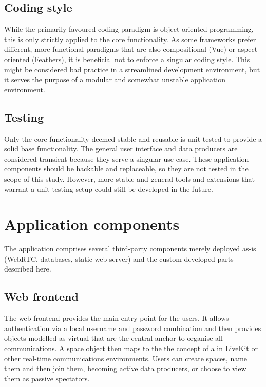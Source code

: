 \subsection{Coding style}

While the primarily favoured coding paradigm is object-oriented programming, this is only strictly applied to the core functionality. As some frameworks prefer different, more functional paradigms that are also compositional (Vue) or aspect-oriented (Feathers), it is beneficial not to enforce a singular coding style. This might be considered bad practice in a streamlined development environment, but it serves the purpose of a modular and somewhat unstable  application environment.

\subsection{Testing}

Only the core functionality deemed stable and reusable is unit-tested to provide a solid base functionality. The general user interface and data producers are considered transient because they serve a singular use case. These application components should be hackable and replaceable, so they are not tested in the scope of this study. However, more stable and general tools and extensions that warrant a unit testing setup could still be developed in the future.

\section{Application components}

The application comprises several third-party components merely deployed as-is (WebRTC, databases, static web server) and the custom-developed parts described here.

\subsection{Web frontend}

The web frontend provides the main entry point for the users. It allows authentication via a local username and password combination and then provides objects modelled as virtual  that are the central anchor to organise all communications. A space object then maps to the the concept of a  in LiveKit or other real-time communications environments. Users can create spaces, name them and then join them, becoming active data producers, or choose to view them as passive spectators.

